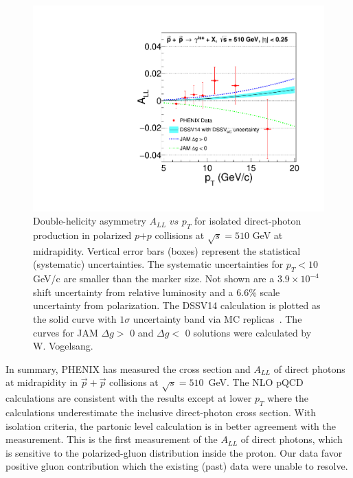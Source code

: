 \documentclass[twocolumn,letterpaper,aps,prl,longbibliography,superscriptaddress,floatfix]{revtex4-2}
\newcommand{\pT}{\mbox{$p_T$}\xspace}
\newcommand{\ALL}{\mbox{$A_{LL}$}\xspace}
\begin{document}
\begin{figure}[htb]
\includegraphics[width=1.0\linewidth]{IsoPhotonALL-beam2.pdf}
\caption{Double-helicity asymmetry $A_{LL}$ $vs$ $p_{T}$ for isolated 
direct-photon production in polarized $p$$+$$p$ collisions at 
$\sqrt{s}=510$ GeV at midrapidity. Vertical error bars (boxes) represent 
the statistical (systematic) uncertainties. The systematic uncertainties
for $p_T < 10$ GeV/c are smaller than the marker size. Not shown are
a $3.9{\times}10^{-4}$ shift uncertainty from relative luminosity and 
a 6.6\% scale uncertainty from polarization. The DSSV14 calculation is 
plotted as the solid curve with $1\sigma$ uncertainty band via MC 
replicas~\protect\cite{PhysRevLett.101.072001,PhysRevLett.113.012001,PhysRevD.100.114027}.
The curves for JAM $\Delta g >$ 0 and $\Delta g <$ 0 solutions \cite{PhysRevD.105.074022}
were calculated by W. Vogelsang.
}
\label{fig:all}
\end{figure}


In summary, PHENIX has measured the cross section and \ALL of direct 
photons at midrapidity in $\vec{p}+\vec{p}$ collisions at 
$\sqrt{s}=510$~GeV. The NLO pQCD calculations are consistent with the 
results except at lower \pT where the calculations underestimate the 
inclusive direct-photon cross section. With isolation criteria, the 
partonic level calculation is in better agreement with the measurement. 
This is the first measurement of the \ALL of direct photons, which is 
sensitive to the polarized-gluon distribution inside the proton.
Our data favor positive gluon contribution which the existing
(past) data were unable to resolve.
\end{document}
